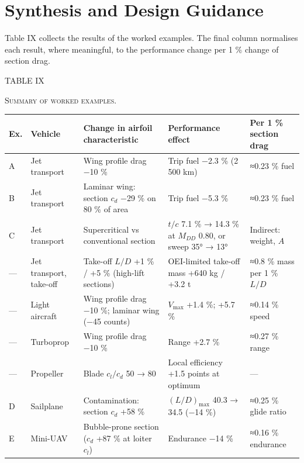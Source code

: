 \documentclass[10pt,a4paper,twocolumn]{article}
\begin{document}
\hypertarget{synthesis-and-design-guidance}{%
\section{Synthesis and Design
Guidance}\label{synthesis-and-design-guidance}}

Table IX collects the results of the worked examples. The final column
normalises each result, where meaningful, to the performance change per
1 \% change of section drag.

\begin{table}[!t]
\centering
{\footnotesize TABLE IX\par\textsc{Summary of worked examples.}\par}\vspace{4pt}
{\footnotesize\setlength{\tabcolsep}{4pt}\renewcommand{\arraystretch}{1.12}
\begin{tabularx}{\textwidth}{l>{\raggedright\arraybackslash}X>{\raggedright\arraybackslash}X>{\raggedright\arraybackslash}X>{\raggedright\arraybackslash}X}
\toprule
\textbf{Ex.} & \textbf{Vehicle} & \textbf{Change in airfoil characteristic} & \textbf{Performance effect} & \textbf{Per 1 \% section drag} \\
\midrule
A & Jet transport & Wing profile drag −10 \% & Trip fuel −2.3 \% (2 500 km) & ≈0.23 \% fuel \\
B & Jet transport & Laminar wing: section \(c_d\) −29 \% on 80 \% of area & Trip fuel −5.3 \% & ≈0.23 \% fuel \\
C & Jet transport & Supercritical vs conventional section & \(t/c\) 7.1 \% → 14.3 \% at \(M_{DD}\) 0.80, or sweep 35° → 13° & Indirect: weight, \(A\) \\
--- & Jet transport, take-off & Take-off \(L/D\) +1 \% / +5 \% (high-lift sections) & OEI-limited take-off mass +640 kg / +3.2 t & ≈0.8 \% mass per 1 \% \(L/D\) \\
--- & Light aircraft & Wing profile drag −10 \%; laminar wing (−45 counts) & \(V_{\max}\) +1.4 \%; +5.7 \% & ≈0.14 \% speed \\
--- & Turboprop & Wing profile drag −10 \% & Range +2.7 \% & ≈0.27 \% range \\
--- & Propeller & Blade \(c_l/c_d\) 50 → 80 & Local efficiency +1.5 points at optimum & --- \\
D & Sailplane & Contamination: section \(c_d\) +58 \% & \((L/D)_{\max}\) 40.3 → 34.5 (−14 \%) & ≈0.25 \% glide ratio \\
E & Mini-UAV & Bubble-prone section (\(c_d\) +87 \% at loiter \(c_l\)) & Endurance −14 \% & ≈0.16 \% endurance \\

\end{tabularx}}
\end{table}
\end{document}
